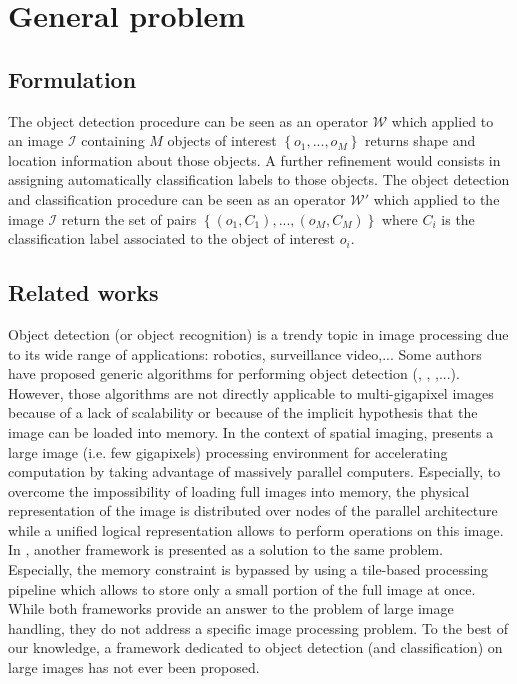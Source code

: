 \label{chap:context}
\section{General problem}
\subsection{Formulation}
The object detection procedure can be seen as an operator $\mathcal{W}$ which applied to an image $\mathcal{I}$ containing $M$ objects of interest $\left\{o_1,...,o_M\right\}$ returns shape and location information about those objects. A further refinement would consists in assigning automatically classification labels to those objects. The object detection and classification procedure can be seen as an operator $\mathcal{W}'$ which applied to the image $\mathcal{I}$ return the set of pairs $\left\{\left(o_1, C_1\right), ..., \left(o_M, C_M\right)\right\}$ where $C_i$ is the classification label associated to the object of interest $o_i$. 

\subsection{Related works}
Object detection (or object recognition) is a trendy topic in image processing due to its wide range of applications: robotics, surveillance video,...  Some authors have proposed generic algorithms for performing object detection (\cite{lecun2004learning}, \cite{opelt2006generic}, \cite{wang2013regionlets},...). However, those algorithms are not directly applicable to multi-gigapixel images because of a lack of scalability or because of the implicit hypothesis that the image can be loaded into memory. In the context of spatial imaging, \cite{jones2003gigapixel} presents a large image (i.e. few gigapixels) processing environment for accelerating computation by taking advantage of massively parallel computers. Especially, to overcome the impossibility of loading full images into memory, the physical representation of the image is distributed over nodes of the parallel architecture while a unified logical representation allows to perform operations on this image. In \cite{powell2010scalable}, another framework is presented as a solution to the same problem. Especially, the memory constraint is bypassed by using a tile-based processing pipeline which allows to store only a small portion of the full image at once. While both frameworks provide an answer to the problem of large image handling, they do not address a specific image processing problem. To the best of our knowledge, a framework dedicated to object detection (and classification) on large images has not ever been proposed.

